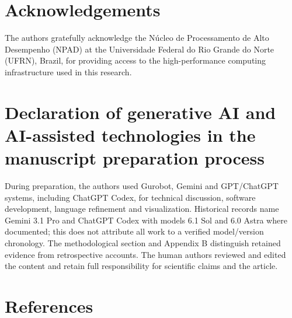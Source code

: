 \documentclass[
  english,
  11pt,
  a4paper,
  authoryear,
  preprint]{elsarticle}
\begin{document}
\section{Acknowledgements}\label{acknowledgements}

The authors gratefully acknowledge the Núcleo de Processamento de Alto
Desempenho (NPAD) at the Universidade Federal do Rio Grande do Norte
(UFRN), Brazil, for providing access to the high-performance computing
infrastructure used in this research.

\section{Declaration of generative AI and AI-assisted technologies in
the manuscript preparation
process}\label{declaration-of-generative-ai-and-ai-assisted-technologies-in-the-manuscript-preparation-process}

During preparation, the authors used Gurobot, Gemini and GPT/ChatGPT
systems, including ChatGPT Codex, for technical discussion, software
development, language refinement and visualization. Historical records
name Gemini 3.1 Pro and ChatGPT Codex with models 6.1 Sol and 6.0 Astra
where documented; this does not attribute all work to a verified
model/version chronology. The methodological section and Appendix B
distinguish retained evidence from retrospective accounts. The human
authors reviewed and edited the content and retain full responsibility
for scientific claims and the article.

\section{References}\label{references}

\renewcommand{\bibsection}{}

\end{document}
